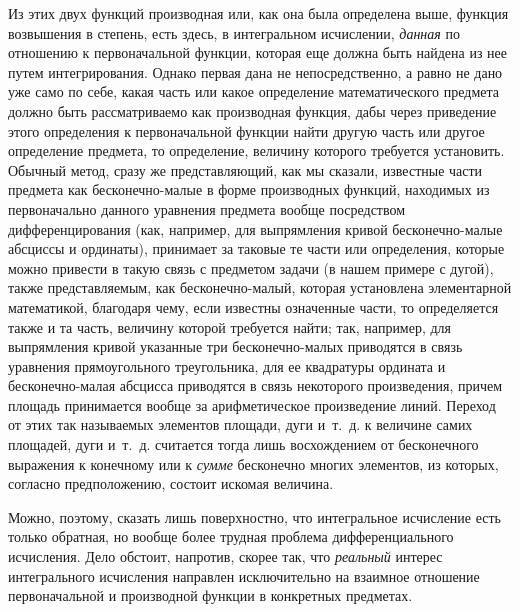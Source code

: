 Из этих двух функций производная или, как она была определена выше, функция
возвышения в степень, есть здесь, в интегральном исчислении,
{\em данная} по отношению к первоначальной функции,
которая еще должна быть найдена из нее путем интегрирования. Однако первая
дана не непосредственно, а равно не дано уже само по себе, какая часть или
какое определение математического предмета должно быть рассматриваемо как
производная функция, дабы через приведение этого определения к
первоначальной функции найти другую часть или другое определение предмета,
то определение, величину которого требуется установить. Обычный метод,
сразу же представляющий, как мы сказали, известные части предмета как
бесконечно-малые в форме производных функций, находимых из первоначально
данного уравнения предмета вообще посредством дифференцирования (как,
например, для выпрямления кривой бесконечно-малые абсциссы и ординаты),
принимает за таковые те части или определения, которые можно привести в
такую связь с предметом задачи (в нашем примере с дугой), также
представляемым, как бесконечно-малый, которая установлена элементарной
математикой, благодаря чему, если известны означенные части, то
определяется также и та часть, величину которой требуется найти; так,
например, для выпрямления кривой указанные три бесконечно-малых приводятся
в связь уравнения прямоугольного треугольника, для ее квадратуры ордината и
бесконечно-малая абсцисса приводятся в связь некоторого произведения,
причем площадь принимается вообще за арифметическое произведение линий.
Переход от этих так называемых элементов площади, дуги и~т.~д. к величине
самих площадей, дуги и~т.~д. считается тогда лишь восхождением от
бесконечного выражения к конечному или к {\em сумме}
бесконечно многих элементов, из которых, согласно предположению, состоит
искомая величина.

Можно, поэтому, сказать лишь поверхностно, что интегральное исчисление есть
только обратная, но вообще более трудная проблема дифференциального
исчисления. Дело обстоит, напротив, скорее так, что
{\em реальный} интерес интегрального исчисления
направлен исключительно на взаимное отношение первоначальной и производной
функции в конкретных предметах.

